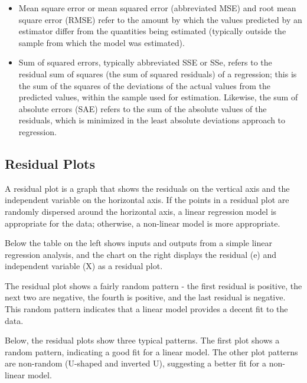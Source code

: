 \documentclass[a4paper,12pt]{article}
\begin{document}
\begin{itemize}
	\item Mean square error or mean squared error (abbreviated MSE) and root mean square error (RMSE) refer to the amount by which the values predicted by an estimator differ from the quantities being estimated (typically outside the sample from which the model was estimated).
	
	\item 
	Sum of squared errors, typically abbreviated SSE or SSe, refers to the residual sum of squares (the sum of squared residuals) of a regression; this is the sum of the squares of the deviations of the actual values from the predicted values, within the sample used for estimation. Likewise, the sum of absolute errors (SAE) refers to the sum of the absolute values of the residuals, which is minimized in the least absolute deviations approach to regression.
	
\end{itemize}

\subsection{Residual Plots}
A residual plot is a graph that shows the residuals on the vertical axis and the independent variable on the horizontal axis. If the points in a residual plot are randomly dispersed around the horizontal axis, a linear regression model is appropriate for the data; otherwise, a non-linear model is more appropriate.

Below the table on the left shows inputs and outputs from a simple linear regression analysis, and the chart on the right displays the residual (e) and independent variable (X) as a residual plot.


The residual plot shows a fairly random pattern - the first residual is positive, the next two are negative, the fourth is positive, and the last residual is negative. This random pattern indicates that a linear model provides a decent fit to the data.

Below, the residual plots show three typical patterns. The first plot shows a random pattern, indicating a good fit for a linear model. The other plot patterns are non-random (U-shaped and inverted U), suggesting a better fit for a non-linear model.
\end{document}

